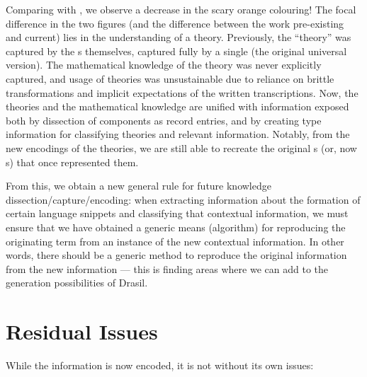 Comparing  with , we
observe a decrease in the scary orange colouring! The focal difference in the
two figures (and the difference between the work pre-existing and current) lies
in the understanding of a theory. Previously, the ``theory'' was captured by the
\RelationConcept{}s themselves, captured fully by a single \Expr{} (the original
universal version). The mathematical knowledge of the theory was never
explicitly captured, and usage of theories was unsustainable due to reliance on
brittle transformations  and implicit
expectations of the written transcriptions. Now, the theories and the
mathematical knowledge are unified with information exposed both by dissection
of components as record entries, and by creating type information for
classifying theories and relevant information. Notably, from the new encodings
of the theories, we are still able to recreate the original \Expr{}s (or, now
\ModelExpr{}s) that once represented them.



From this, we obtain a new general rule for future knowledge
dissection/capture/encoding: when extracting information about the formation of
certain language snippets and classifying that contextual information, we must
ensure that we have obtained a generic means (algorithm) for reproducing the
originating term from an instance of the new contextual information. In other
words, there should be a generic method to reproduce the original information
from the new information — this is finding areas where we can add to the
generation possibilities of Drasil.

\section{Residual Issues}

While the information is now encoded, it is not without its own issues:

